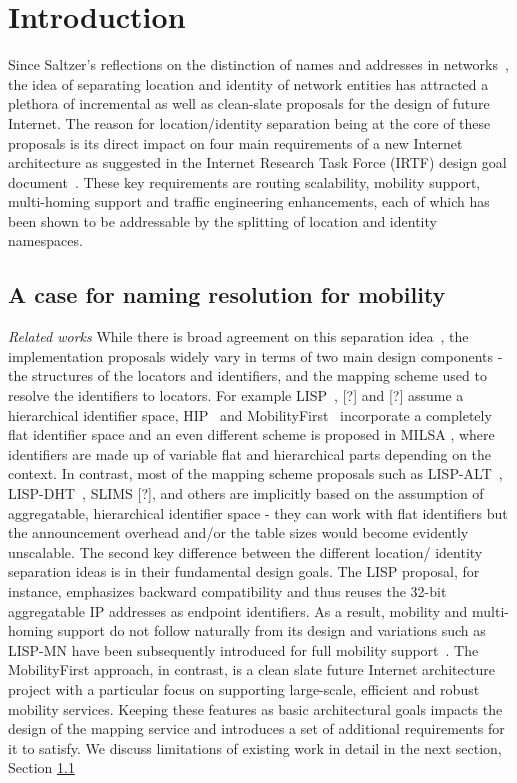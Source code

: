 \section{Introduction}

Since Saltzer's reflections on the distinction of names and addresses in networks~\cite{saltzer}, the idea of separating location and identity of network entities has attracted a plethora of incremental as well as clean-slate proposals for the design of future Internet. The reason for location/identity separation being at the core of these proposals is its direct impact on four main requirements of a new Internet architecture as suggested in the Internet Research Task Force (IRTF) design goal document~\cite{li_design}. These key requirements are routing scalability, mobility support, multi-homing support and traffic engineering enhancements, each of which has been shown to be addressable by the splitting of location and identity namespaces. 
\subsection{A case for naming resolution for mobility}
\emph{Related works}
While there is broad agreement on this separation idea~\cite{li}, the implementation proposals widely vary in terms of two main design components - the structures of the locators and identifiers, and the mapping scheme used to resolve the identifiers to locators. For example LISP~\cite{farinacci}, [?] and [?] assume a hierarchical identifier space, HIP~\cite{moskowitz} and MobilityFirst~\cite{mobilityFirst} incorporate a completely flat identifier space and an even different scheme is proposed in MILSA \cite{milsa}, where identifiers are made up of variable flat and hierarchical parts depending on the context. In contrast, most of the mapping scheme proposals such as LISP-ALT~\cite{farinacci-alt}, LISP-DHT~\cite{mathy}, SLIMS [?], and others are implicitly based on the assumption of aggregatable, hierarchical identifier space - they can work with flat identifiers but the announcement overhead and/or the table sizes would become evidently unscalable. The second key difference between the different location/ identity separation ideas is in their fundamental design goals. The LISP proposal, for instance, emphasizes backward compatibility and thus reuses the 32-bit aggregatable IP addresses as endpoint identifiers. As a result, mobility and multi-homing support do not follow naturally from its design and variations such as LISP-MN have been subsequently introduced for full mobility support~\cite{farinacci-mn}. The MobilityFirst approach, in contrast, is a clean slate future Internet architecture project with a particular focus on supporting large-scale, efficient and robust mobility services. Keeping these features as basic architectural goals impacts the design of the mapping service and introduces a set of additional requirements for it to satisfy.
We discuss limitations of existing work in detail in the next section, Section \ref{}

